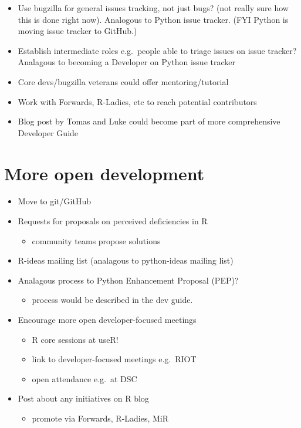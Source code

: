 \documentclass[]{book}
\providecommand{\tightlist}{%
  \setlength{\itemsep}{0pt}\setlength{\parskip}{0pt}}
\begin{document}
\begin{itemize}
\item
  Use bugzilla for general issues tracking, not just bugs? (not really sure how this is done right now). Analogous to Python issue tracker. (FYI Python is moving issue tracker to GitHub.)
\item
  Establish intermediate roles e.g.~people able to triage issues on issue tracker? Analagous to becoming a Developer on Python issue tracker
\item
  Core devs/bugzilla veterans could offer mentoring/tutorial
\item
  Work with Forwards, R-Ladies, etc to reach potential contributors
\item
  Blog post by Tomas and Luke could become part of more comprehensive Developer Guide
\end{itemize}

\hypertarget{more-open-development}{%
\chapter{More open development}\label{more-open-development}}

\begin{itemize}
\item
  Move to git/GitHub
\item
  Requests for proposals on perceived deficiencies in R

  \begin{itemize}
  \tightlist
  \item
    community teams propose solutions
  \end{itemize}
\item
  R-ideas mailing list (analagous to python-ideas mailing list)
\item
  Analagous process to Python Enhancement Proposal (PEP)?

  \begin{itemize}
  \tightlist
  \item
    process would be described in the dev guide.
  \end{itemize}
\item
  Encourage more open developer-focused meetings

  \begin{itemize}
  \tightlist
  \item
    R core sessions at useR!
  \item
    link to developer-focused meetings e.g.~RIOT
  \item
    open attendance e.g.~at DSC
  \end{itemize}
\item
  Post about any initiatives on R blog

  \begin{itemize}
  \tightlist
  \item
    promote via Forwards, R-Ladies, MiR
  \end{itemize}
\end{itemize}
\end{document}
